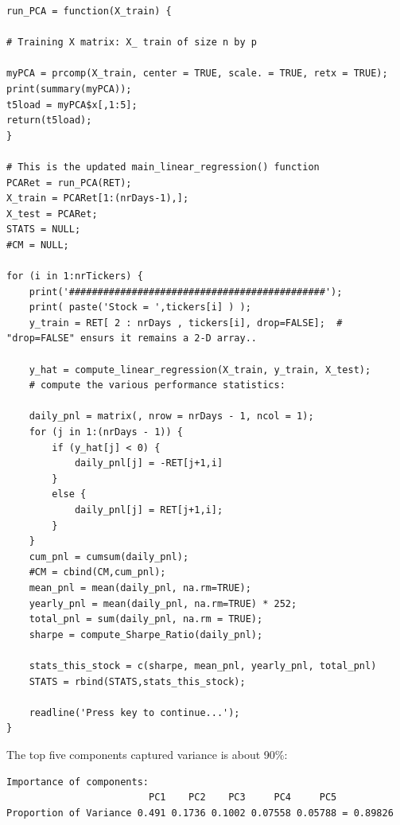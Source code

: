 \documentclass[12pt]{article}
\begin{document}
\begin{lstlisting}
run_PCA = function(X_train) {

# Training X matrix: X_ train of size n by p

myPCA = prcomp(X_train, center = TRUE, scale. = TRUE, retx = TRUE);
print(summary(myPCA));
t5load = myPCA$x[,1:5];
return(t5load);
}

# This is the updated main_linear_regression() function
PCARet = run_PCA(RET);
X_train = PCARet[1:(nrDays-1),];
X_test = PCARet;
STATS = NULL;
#CM = NULL;

for (i in 1:nrTickers) {
	print('#############################################');
	print( paste('Stock = ',tickers[i] ) );
	y_train = RET[ 2 : nrDays , tickers[i], drop=FALSE];  # "drop=FALSE" ensurs it remains a 2-D array..

	y_hat = compute_linear_regression(X_train, y_train, X_test);
	# compute the various performance statistics:
	
	daily_pnl = matrix(, nrow = nrDays - 1, ncol = 1);
	for (j in 1:(nrDays - 1)) {
		if (y_hat[j] < 0) {
			daily_pnl[j] = -RET[j+1,i]
		}
		else {
			daily_pnl[j] = RET[j+1,i];
		}
	}
	cum_pnl = cumsum(daily_pnl);
	#CM = cbind(CM,cum_pnl);
	mean_pnl = mean(daily_pnl, na.rm=TRUE);
	yearly_pnl = mean(daily_pnl, na.rm=TRUE) * 252;
	total_pnl = sum(daily_pnl, na.rm = TRUE);
	sharpe = compute_Sharpe_Ratio(daily_pnl);
	
	stats_this_stock = c(sharpe, mean_pnl, yearly_pnl, total_pnl)
	STATS = rbind(STATS,stats_this_stock);

	readline('Press key to continue...');
}
\end{lstlisting}
\hfill \break
The top five components captured variance is about 90\%:
\begin{lstlisting}
Importance of components:
                         PC1    PC2    PC3     PC4     PC5
Proportion of Variance 0.491 0.1736 0.1002 0.07558 0.05788 = 0.89826
\end{lstlisting}
\end{document}
